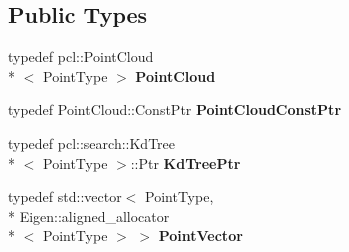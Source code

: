 \subsection*{Public Types}
\begin{DoxyCompactItemize}
\item 
\hypertarget{classope_1_1_table_object_detector_a43781f8b76b67c1754edfda2f5d6b032}{typedef pcl\-::\-Point\-Cloud\\*
$<$ Point\-Type $>$ {\bfseries Point\-Cloud}}\label{classope_1_1_table_object_detector_a43781f8b76b67c1754edfda2f5d6b032}

\item 
\hypertarget{classope_1_1_table_object_detector_a4f837e1647244396b22f1fb04cfa97ee}{typedef Point\-Cloud\-::\-Const\-Ptr {\bfseries Point\-Cloud\-Const\-Ptr}}\label{classope_1_1_table_object_detector_a4f837e1647244396b22f1fb04cfa97ee}

\item 
\hypertarget{classope_1_1_table_object_detector_a2dd23dfc9515ba4f63e6b655ae6fae97}{typedef pcl\-::search\-::\-Kd\-Tree\\*
$<$ Point\-Type $>$\-::Ptr {\bfseries Kd\-Tree\-Ptr}}\label{classope_1_1_table_object_detector_a2dd23dfc9515ba4f63e6b655ae6fae97}

\item 
\hypertarget{classope_1_1_table_object_detector_a3686e6d9463b8566241b9f9e4cd33032}{typedef std\-::vector$<$ Point\-Type, \\*
Eigen\-::aligned\-\_\-allocator\\*
$<$ Point\-Type $>$ $>$ {\bfseries Point\-Vector}}\label{classope_1_1_table_object_detector_a3686e6d9463b8566241b9f9e4cd33032}

\end{DoxyCompactItemize}
